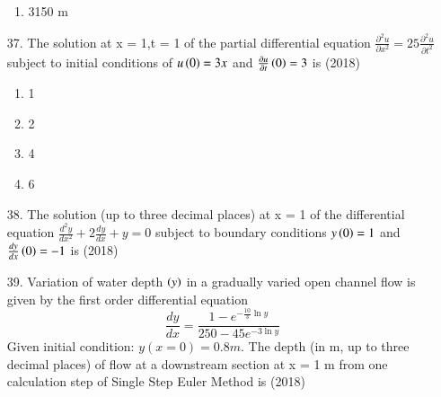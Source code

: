 \documentclass[journal]{IEEEtran}
\begin{document}
\begin{enumerate}
\begin{enumerate}[label=(\Alph*)]
        \item 3150 m 
    \end{enumerate}
    \item[37.]The solution at x = 1,t = 1 of the partial differential equation $\frac{\partial ^2 u}{\partial x^2} = 25\frac{\partial^2u}{\partial t^2}$ subject to initial conditions of $u\left(0\right) = 3x$ and $\frac{\partial u}{\partial t}\left(0\right)=3$ is \hfill (2018)
    \begin{enumerate}[label=(\Alph*)]
        \item 1
        \item 2
        \item 4
        \item 6
    \end{enumerate}
    \item[38.] The solution (up to three decimal places) at x = 1 of the differential equation $\frac{d^2y}{dx^2}+2\frac{dy}{dx}+y=0$ subject to boundary conditions $y\left(0\right)=1$ and $\frac{dy}{dx}\left(0\right) = -1$ is \hfill (2018)
    \item[39.] Variation of water depth $\left(y\right)$ in a gradually varied open channel flow is given by the first
    order differential equation $$\frac{dy}{dx} = \frac{1-e^{-\frac{10}{3}\ln y}}{250-45e^{-3\ln y}}$$Given initial condition: $y(x = 0) = 0.8 m$. The depth (in m, up to three decimal places) of
    flow at a downstream section at x = 1 m from one calculation step of Single Step Euler Method is \hfill (2018)
     
\end{enumerate}
\end{document}

